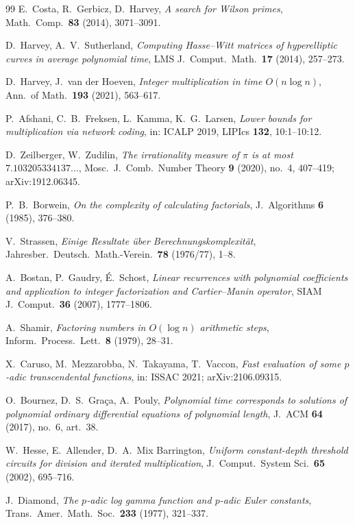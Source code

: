 \documentclass[11pt]{article}
\theoremstyle{remark}
\theoremstyle{definition}
\begin{document}
\begin{thebibliography}{99}
E.~Costa, R.~Gerbicz, D.~Harvey,
\emph{A search for Wilson primes},
Math.\ Comp.\ \textbf{83} (2014), 3071--3091.

D.~Harvey, A.~V.~Sutherland,
\emph{Computing Hasse--Witt matrices of hyperelliptic curves in average
polynomial time},
LMS J.\ Comput.\ Math.\ \textbf{17} (2014), 257--273.

D.~Harvey, J.~van der Hoeven,
\emph{Integer multiplication in time $O(n\log n)$},
Ann.\ of Math.\ \textbf{193} (2021), 563--617.

P.~Afshani, C.~B.~Freksen, L.~Kamma, K.~G.~Larsen,
\emph{Lower bounds for multiplication via network coding},
in: ICALP 2019, LIPIcs \textbf{132}, 10:1--10:12.

D.~Zeilberger, W.~Zudilin,
\emph{The irrationality measure of $\pi$ is at most $7.103205334137\ldots$},
Mosc.\ J.\ Comb.\ Number Theory \textbf{9} (2020), no.~4, 407--419; arXiv:1912.06345.

P.~B.~Borwein,
\emph{On the complexity of calculating factorials},
J.\ Algorithms \textbf{6} (1985), 376--380.

V.~Strassen,
\emph{Einige Resultate \"uber Berechnungskomplexit\"at},
Jahresber.\ Deutsch.\ Math.-Verein.\ \textbf{78} (1976/77), 1--8.

A.~Bostan, P.~Gaudry, \'E.~Schost,
\emph{Linear recurrences with polynomial coefficients and application to
integer factorization and Cartier--Manin operator},
SIAM J.\ Comput.\ \textbf{36} (2007), 1777--1806.

A.~Shamir,
\emph{Factoring numbers in $O(\log n)$ arithmetic steps},
Inform.\ Process.\ Lett.\ \textbf{8} (1979), 28--31.

X.~Caruso, M.~Mezzarobba, N.~Takayama, T.~Vaccon,
\emph{Fast evaluation of some $p$-adic transcendental functions},
in: ISSAC 2021; arXiv:2106.09315.

O.~Bournez, D.~S.~Gra\c{c}a, A.~Pouly,
\emph{Polynomial time corresponds to solutions of polynomial ordinary
differential equations of polynomial length},
J.~ACM \textbf{64} (2017), no.~6, art.~38.

W.~Hesse, E.~Allender, D.~A.~Mix Barrington,
\emph{Uniform constant-depth threshold circuits for division and
iterated multiplication},
J.~Comput.\ System Sci.\ \textbf{65} (2002), 695--716.

J.~Diamond,
\emph{The $p$-adic log gamma function and $p$-adic Euler constants},
Trans.\ Amer.\ Math.\ Soc.\ \textbf{233} (1977), 321--337.


\end{thebibliography}
\end{document}
